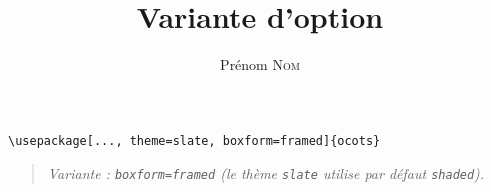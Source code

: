 \documentclass[11pt]{ocots-book}
\title{Variante d'option}
\author{Prénom \textsc{Nom}}
\newcommand{\ocotsvariantnote}[1]{\begin{quote}\itshape Variante : #1\end{quote}}
\begin{document}
\maketitle

\begin{lstlisting}
\usepackage[..., theme=slate, boxform=framed]{ocots}
\end{lstlisting}
\ocotsvariantnote{\texttt{boxform=framed} (le th\`eme \texttt{slate} utilise par d\'efaut \texttt{shaded}).}

\end{document}
